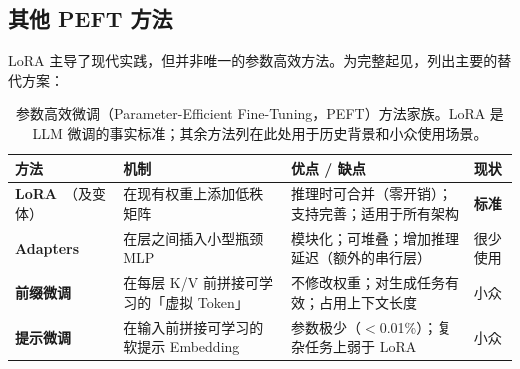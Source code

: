 \subsection{其他 PEFT 方法}
\label{other-peft-approaches}

LoRA 主导了现代实践，但并非唯一的参数高效方法。为完整起见，列出主要的替代方案：

\begin{table}[ht!]
\centering\small
\caption{参数高效微调（Parameter-Efficient Fine-Tuning，PEFT）方法家族。LoRA 是 LLM 微调的事实标准；其余方法列在此处用于历史背景和小众使用场景。}
\noindent\begin{tabularx}{\linewidth}{@{}l Z{1.21} Z{1.51} Z{0.3}@{}}
\toprule
\textbf{方法} & \textbf{机制} & \textbf{优点 / 缺点} & \textbf{现状} \\
\midrule
\textbf{LoRA}~\cite{hu2021lora}（及变体） & 在现有权重上添加低秩矩阵 & 推理时可合并（零开销）；支持完善；适用于所有架构 & \textbf{标准} \\
\textbf{Adapters}~\cite{houlsby2019adapters} & 在层之间插入小型瓶颈 MLP & 模块化；可堆叠；增加推理延迟（额外的串行层） & 很少使用 \\
\textbf{前缀微调}~\cite{li2021prefix} & 在每层 K/V 前拼接可学习的「虚拟 Token」 & 不修改权重；对生成任务有效；占用上下文长度 & 小众 \\
\textbf{提示微调}~\cite{lester2021prompt} & 在输入前拼接可学习的软提示 Embedding & 参数极少（$<$0.01\%）；复杂任务上弱于 LoRA & 小众 \\

\end{tabularx}
\end{table}
